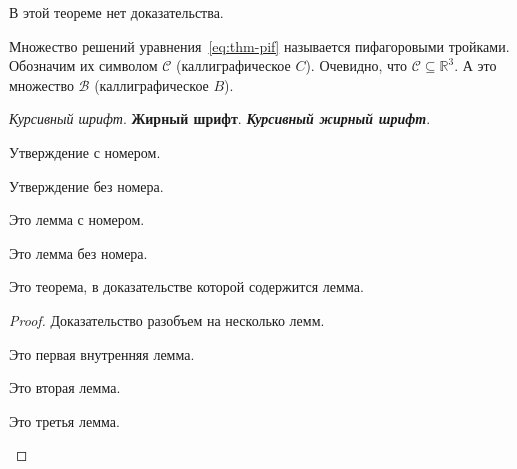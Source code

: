\documentclass[colorthm, toc]{../civarticle}
\begin{document}
\begin{theorem}\label{thm:example:noproof}
  В этой теореме нет доказательства.
  \Blindtext[2]
\end{theorem}

\Blindtext[2]

Множество решений уравнения~\eqref{eq:thm-pif} называется пифагоровыми
тройками.  Обозначим их символом $\mathcal{C}$ (каллиграфическое $C$).
Очевидно, что $\mathcal{C}\subseteq \mathbb{R}^{3}$.  А это множество
$\mathcal{B}$ (каллиграфическое $B$).

\textit{Курсивный шрифт}.  \textbf{Жирный шрифт}.
\textit{\textbf{Курсивный жирный шрифт}}.


\begin{proposition}\label{prop:example:numbered}
  Утверждение с номером.
  \Blindtext[2]
\end{proposition}

\begin{proposition*}
  Утверждение без номера.
  \Blindtext[2]
\end{proposition*}

\Blindtext[2]

\begin{lemma}\label{lem:example:numbered}
  Это лемма с номером.
  \Blindtext[2]
\end{lemma}

\begin{lemma*}
  Это лемма без номера.
  \Blindtext[2]
\end{lemma*}

\begin{theorem}\label{thm:example:withlemm}
  Это теорема, в доказательстве которой содержится лемма.
  \Blindtext[2]
\end{theorem}
\begin{proof}
  Доказательство разобъем на несколько лемм.

  \begin{lemma}\label{lem:example:in-1}
    Это первая внутренняя лемма.
    \Blindtext[2]
  \end{lemma}

  \Blindtext[2]

  \begin{lemma}\label{lem:example:in-2}
    Это вторая лемма.
    \Blindtext[2]
  \end{lemma}

  \begin{lemma}\label{lem:example:in-3}
    Это третья лемма.
    \Blindtext[2]
  \end{lemma}

  \Blindtext[2]
 \end{proof}
\end{document}

